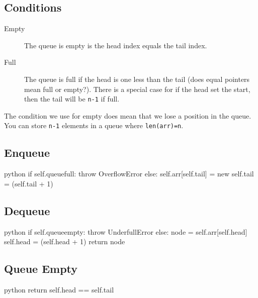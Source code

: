 \subsection{Conditions}\label{sub:queueconditions}

\begin{description}
    \item[Empty] The queue is empty is the head index equals the tail index.
    \item[Full] The queue is full if the head is one less than the tail (does equal pointers mean full or empty?). There is a special case for if the head set the start, then the tail will be \texttt{n-1} if full.
\end{description}
\begin{note}
    The condition we use for empty does mean that we lose a position in the queue.
    You can store \texttt{n-1} elements in a queue where \texttt{len(arr)=n}.
\end{note}

\subsection{Enqueue}\label{sub:enqueue}

\begin{code}{python}
    if self.queuefull:
        throw OverflowError
    else:
        self.arr[self.tail] = new
        self.tail = (self.tail + 1) %
\end{code}

\subsection{Dequeue}\label{sub:dequeue}

\begin{code}{python}
    if self.queueempty:
        throw UnderfullError
    else:
        node = self.arr[self.head]
        self.head = (self.head + 1) %
        return node
\end{code}

\subsection{Queue Empty}\label{sub:queueempty}

\begin{code}{python}
    return self.head == self.tail
\end{code}

